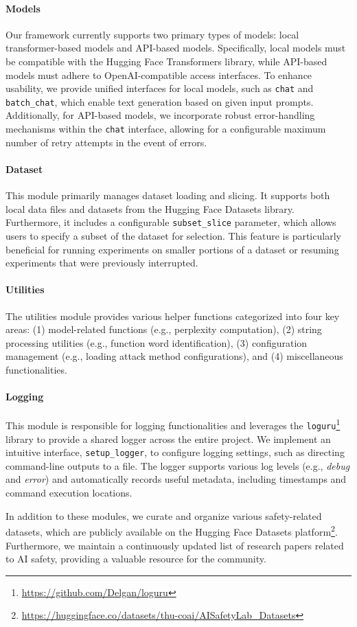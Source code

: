 \paragraph{Models} Our framework currently supports two primary types of models: local transformer-based models and API-based models. Specifically, local models must be compatible with the Hugging Face Transformers library, while API-based models must adhere to OpenAI-compatible access interfaces. To enhance usability, we provide unified interfaces for local models, such as \texttt{chat} and \texttt{batch\_chat}, which enable text generation based on given input prompts. Additionally, for API-based models, we incorporate robust error-handling mechanisms within the \texttt{chat} interface, allowing for a configurable maximum number of retry attempts in the event of errors.

\paragraph{Dataset} This module primarily manages dataset loading and slicing. It supports both local data files and datasets from the Hugging Face Datasets library. Furthermore, it includes a configurable \texttt{subset\_slice} parameter, which allows users to specify a subset of the dataset for selection. This feature is particularly beneficial for running experiments on smaller portions of a dataset or resuming experiments that were previously interrupted.

\paragraph{Utilities} The utilities module provides various helper functions categorized into four key areas: (1) model-related functions (e.g., perplexity computation), (2) string processing utilities (e.g., function word identification), (3) configuration management (e.g., loading attack method configurations), and (4) miscellaneous functionalities.

\paragraph{Logging} This module is responsible for logging functionalities and leverages the \texttt{loguru}\footnote{\url{https://github.com/Delgan/loguru}} library to provide a shared logger across the entire project. We implement an intuitive interface, \texttt{setup\_logger}, to configure logging settings, such as directing command-line outputs to a file. The logger supports various log levels (e.g., \textit{debug} and \textit{error}) and automatically records useful metadata, including timestamps and command execution locations.

In addition to these modules, we curate and organize various safety-related datasets, which are publicly available on the Hugging Face Datasets platform\footnote{\url{https://huggingface.co/datasets/thu-coai/AISafetyLab_Datasets}}. Furthermore, we maintain a continuously updated list of research papers related to AI safety, providing a valuable resource for the community.